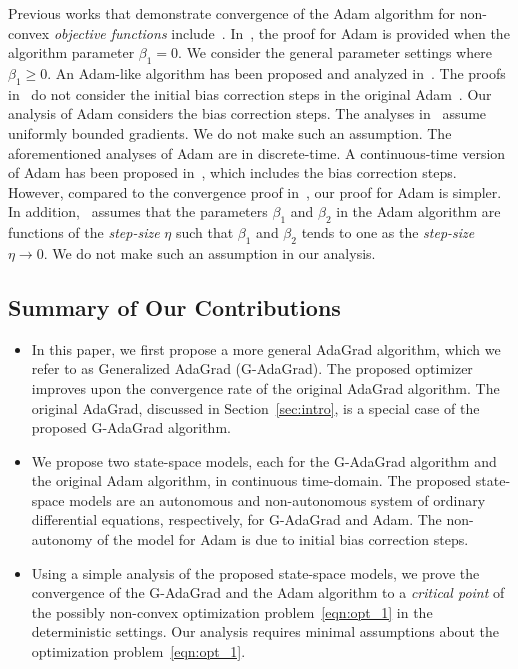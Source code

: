 Previous works that demonstrate convergence of the Adam algorithm for non-convex {\em objective functions} include~\cite{reddi2018adaptive, de2018convergence, tong2019calibrating, barakat2020convergence, chen2018convergence, barakat2021convergence}. In~\cite{reddi2018adaptive}, the proof for Adam is provided when the algorithm parameter $\beta_1 = 0$. We consider the general parameter settings where $\beta_1 \geq 0$. An Adam-like algorithm has been proposed and analyzed in~\cite{defossez2020simple}. The proofs in~\cite{reddi2018adaptive, de2018convergence, tong2019calibrating, barakat2020convergence, chen2018convergence} do not consider the initial bias correction steps in the original Adam~\cite{kingma2014adam}. Our analysis of Adam considers the bias correction steps. The analyses in~\cite{defossez2020simple, reddi2018adaptive, de2018convergence, tong2019calibrating, chen2018convergence}
assume uniformly bounded gradients. We do not make such an assumption. The aforementioned analyses of Adam are in discrete-time. A continuous-time version of Adam has been proposed in~\cite{barakat2021convergence}, which includes the bias correction steps. However, compared to the convergence proof in~\cite{barakat2021convergence}, our proof for Adam is simpler. In addition,~\cite{barakat2021convergence} assumes that the parameters $\beta_1$ and $\beta_2$ in the Adam algorithm are functions of the {\em step-size} $\eta$ such that $\beta_1$ and $\beta_2$ tends to one as the {\em step-size} $\eta \to 0$. We do not make such an assumption in our analysis.


\subsection{Summary of Our Contributions}
\label{sub:contri}

\begin{itemize}
    \item In this paper, we first propose a more general AdaGrad algorithm, which we refer to as Generalized AdaGrad (G-AdaGrad). The proposed optimizer improves upon the convergence rate of the original AdaGrad algorithm. The original AdaGrad, discussed in Section~\ref{sec:intro}, is a special case of the proposed G-AdaGrad algorithm.
    \item We propose two state-space models, each for the G-AdaGrad algorithm and the original Adam algorithm, in continuous time-domain. The proposed state-space models are an autonomous and non-autonomous system of ordinary differential equations, respectively, for G-AdaGrad and Adam. The non-autonomy of the model for Adam is due to initial bias correction steps.
    \item Using a simple analysis of the proposed state-space models, we prove the convergence of the G-AdaGrad and the Adam algorithm to a {\em critical point} of the possibly non-convex optimization problem~\eqref{eqn:opt_1} in the deterministic settings. Our analysis requires minimal assumptions about the optimization problem~\eqref{eqn:opt_1}.
\end{itemize}
 
